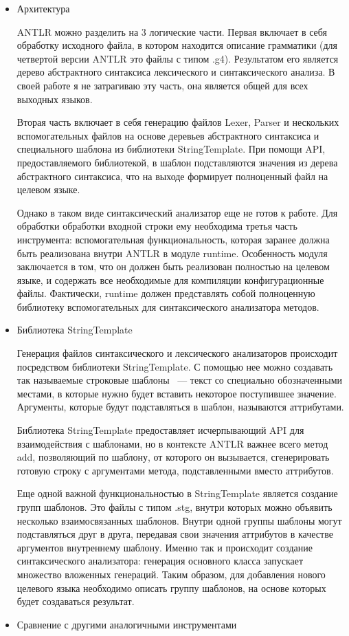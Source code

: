 \begin{itemize}
    \item Архитектура
    
    ANTLR можно разделить на 3 логические части. 
    Первая включает в себя обработку исходного файла, в котором находится описание грамматики (для четвертой версии ANTLR это файлы с типом .g4). 
    Результатом его является дерево абстрактного синтаксиса лексического и синтаксического анализа. 
    В своей работе я не затрагиваю эту часть, она является общей для всех выходных языков.
    
    Вторая часть включает в себя генерацию файлов Lexer, Parser и нескольких вспомогательных файлов на основе деревьев абстрактного синтаксиса и специального шаблона из библиотеки StringTemplate. 
    При помощи API, предоставляемого библиотекой, в шаблон подставляются значения из дерева абстрактного синтаксиса, что на выходе формирует полноценный файл на целевом языке.
    
    Однако в таком виде синтаксический анализатор еще не готов к работе. 
    Для обработки обработки входной строки ему необходима третья часть инструмента: вспомогательная функциональность, которая заранее должна быть реализована внутри ANTLR в модуле runtime. 
    Особенность модуля заключается в том, что он должен быть реализован полностью на целевом языке, и содержать все необходимые для компиляции конфигурационные файлы. 
    Фактически, runtime должен представлять собой полноценную библиотеку вспомогательных для синтаксического анализатора методов.  
    \item Библиотека StringTemplate

    Генерация файлов синтаксического и лексического анализаторов происходит посредством библиотеки StringTemplate. 
    С помощью нее можно создавать так называемые строковые шаблоны ~--- текст со специально обозначенными местами, в которые нужно будет вставить некоторое поступившее значение. 
    Аргументы, которые будут подставляться в шаблон, называются аттрибутами. 
    
    Библиотека StringTemplate предоставляет исчерпывающий API для взаимодействия с шаблонами, но в контексте ANTLR важнее всего метод add, позволяющий по шаблону, от которого он вызывается, сгенерировать готовую строку с аргументами метода, подставленными вместо аттрибутов. 

    Еще одной важной функциональностью в StringTemplate является создание групп шаблонов. 
    Это файлы с типом .stg, внутри которых можно объявить несколько взаимосвязанных шаблонов. 
    Внутри одной группы шаблоны могут подставляться друг в друга, передавая свои значения аттрибутов в качестве аргументов внутреннему шаблону. 
    Именно так и происходит создание синтаксического анализатора: генерация основного класса запускает множество вложенных генераций. 
    Таким образом, для добавления нового целевого языка необходимо описать группу шаблонов, на основе которых будет создаваться результат.
    \item Сравнение с другими аналогичными инструментами


\end{itemize}
